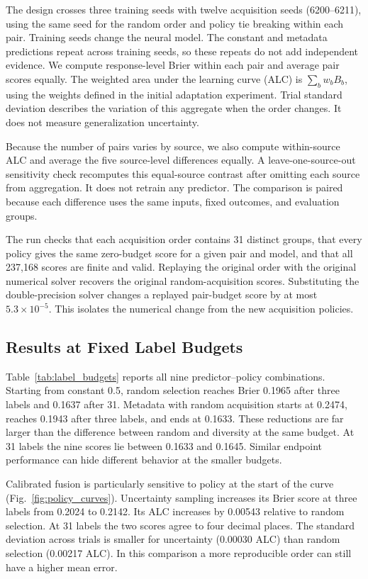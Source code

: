 \documentclass[conference]{IEEEtran}
\begin{document}
The design crosses three training seeds with twelve acquisition seeds (6200--6211), using the same seed for the random order and policy tie breaking within each pair. Training seeds change the neural model. The constant and metadata predictions repeat across training seeds, so these repeats do not add independent evidence. We compute response-level Brier within each pair and average pair scores equally. The weighted area under the learning curve (ALC) is $\sum_b w_b B_b$, using the weights defined in the initial adaptation experiment. Trial standard deviation describes the variation of this aggregate when the order changes. It does not measure generalization uncertainty.

Because the number of pairs varies by source, we also compute within-source ALC and average the five source-level differences equally. A leave-one-source-out sensitivity check recomputes this equal-source contrast after omitting each source from aggregation. It does not retrain any predictor. The comparison is paired because each difference uses the same inputs, fixed outcomes, and evaluation groups.

The run checks that each acquisition order contains 31 distinct groups, that every policy gives the same zero-budget score for a given pair and model, and that all 237,168 scores are finite and valid. Replaying the original order with the original numerical solver recovers the original random-acquisition scores. Substituting the double-precision solver changes a replayed pair-budget score by at most $5.3\times 10^{-5}$. This isolates the numerical change from the new acquisition policies.


\subsection{Results at Fixed Label Budgets}
Table~\ref{tab:label_budgets} reports all nine predictor--policy combinations. Starting from constant 0.5, random selection reaches Brier 0.1965 after three labels and 0.1637 after 31. Metadata with random acquisition starts at 0.2474, reaches 0.1943 after three labels, and ends at 0.1633. These reductions are far larger than the difference between random and diversity at the same budget. At 31 labels the nine scores lie between 0.1633 and 0.1645. Similar endpoint performance can hide different behavior at the smaller budgets.

Calibrated fusion is particularly sensitive to policy at the start of the curve (Fig.~\ref{fig:policy_curves}). Uncertainty sampling increases its Brier score at three labels from 0.2024 to 0.2142. Its ALC increases by 0.00543 relative to random selection. At 31 labels the two scores agree to four decimal places. The standard deviation across trials is smaller for uncertainty (0.00030 ALC) than random selection (0.00217 ALC). In this comparison a more reproducible order can still have a higher mean error.
\end{document}
